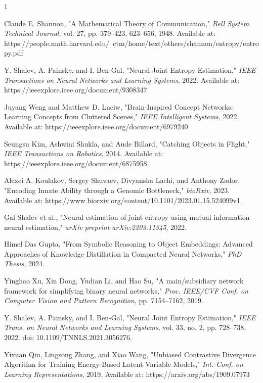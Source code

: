 \documentclass{article}
\begin{document}
 \begin{thebibliography}{1}

 Claude E. Shannon, "A Mathematical Theory of Communication," \textit{Bell System Technical Journal}, vol. 27, pp. 379--423, 623--656, 1948. Available at: https://people.math.harvard.edu/~ctm/home/text/others/shannon/entropy/entropy.pdf

 Y. Shalev, A. Painsky, and I. Ben-Gal, "Neural Joint Entropy Estimation," \textit{IEEE Transactions on Neural Networks and Learning Systems}, 2022. Available at: https://ieeexplore.ieee.org/document/9308347

 Juyang Weng and Matthew D. Luciw, "Brain-Inspired Concept Networks: Learning Concepts from Cluttered Scenes," \textit{IEEE Intelligent Systems}, 2022. Available at: https://ieeexplore.ieee.org/document/6979240

 Seungsu Kim, Ashwini Shukla, and Aude Billard, "Catching Objects in Flight," \textit{IEEE Transactions on Robotics}, 2014. Available at: https://ieeexplore.ieee.org/document/6875958

 Alexei A. Koulakov, Sergey Shuvaev, Divyansha Lachi, and Anthony Zador, "Encoding Innate Ability through a Genomic Bottleneck," \textit{bioRxiv}, 2023. Available at: https://www.biorxiv.org/content/10.1101/2023.01.15.524099v1

 Gal Shalev et al., "Neural estimation of joint entropy using mutual information neural estimation," \textit{arXiv preprint arXiv:2203.11345}, 2022.

 Himel Das Gupta, "From Symbolic Reasoning to Object Embeddings: Advanced Approaches of Knowledge Distillation in Compacted Neural Networks," \textit{PhD Thesis}, 2024.

 Yinghao Xu, Xin Dong, Yudian Li, and Hao Su, "A main/subsidiary network framework for simplifying binary neural networks," \textit{Proc. IEEE/CVF Conf. on Computer Vision and Pattern Recognition}, pp. 7154--7162, 2019.

 Y. Shalev, A. Painsky, and I. Ben-Gal, "Neural Joint Entropy Estimation," \textit{IEEE Trans. on Neural Networks and Learning Systems}, vol. 33, no. 2, pp. 728--738, 2022. doi: 10.1109/TNNLS.2021.3056276.

 Yixuan Qiu, Lingsong Zhang, and Xiao Wang, "Unbiased Contrastive Divergence Algorithm for Training Energy-Based Latent Variable Models," \textit{Int. Conf. on Learning Representations}, 2019. Available at: https://arxiv.org/abs/1909.07973


\end{thebibliography}
\end{document}
